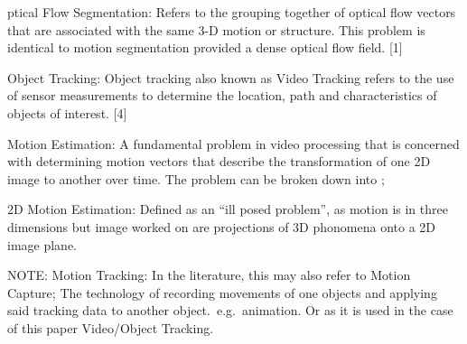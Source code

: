 ptical Flow Segmentation: Refers to the grouping together of optical flow
vectors that are associated with the same 3-D motion or structure. This problem
is identical to motion segmentation provided a dense optical flow field. [1]

Object Tracking: Object tracking also known as Video Tracking refers to the use
of sensor measurements to determine the location, path and characteristics of
objects of interest. [4]
 
Motion Estimation: A fundamental problem in video processing that is concerned
with determining motion vectors that describe the transformation of one 2D
image to another over time. The problem can be broken down into
\cite{Tekalp2014};

2D Motion Estimation: Defined as an “ill posed problem”, as motion is in
three dimensions but image worked on are projections of 3D phonomena onto a
2D image plane.

NOTE:
Motion Tracking: In the literature, this may also refer to Motion Capture;
The technology of recording movements of one objects and applying said
tracking data to another object.\ e.g.\ animation. Or as it is used in the
case of this paper Video/Object Tracking.


